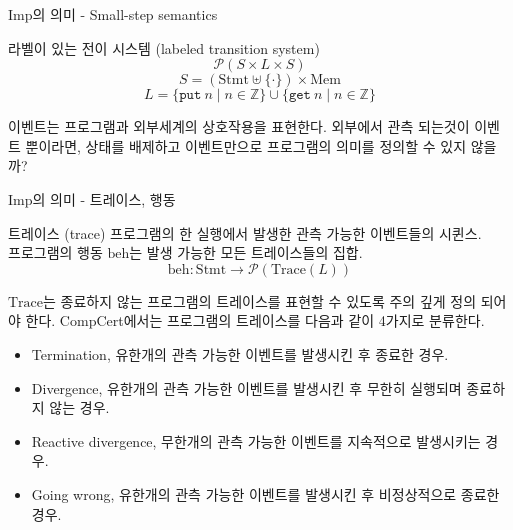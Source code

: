 \documentclass[10pt]{beamer}
\newcommand{\pow}[0]{\mathcal{P}}
\newcommand{\Stmt}[0]{\mathrm{Stmt}}
\newcommand{\putn}[1]{\texttt{put} \ #1}
\newcommand{\getn}[0]{\texttt{get}}
\newcommand{\Mem}[0]{\mathrm{Mem}}
\newcommand{\Trace}[0]{\mathrm{Trace}}
\newcommand{\beh}[0]{\mathrm{beh}}
\newcommand{\hoare}[3]{\{#1\} #2 \{#3\}}
\begin{document}
\begin{frame}{Imp의 의미 - Small-step semantics}
{\begin{block}{라벨이 있는 전이 시스템 (labeled transition system)}
      \[ \pow(S \times L \times S) \]
      \[ S = (\Stmt \uplus \{\cdot\}) \times \Mem \]
      \[ L = \{ \putn{n} \mid n \in \mathbb{Z} \} \cup \{ \getn \ n \mid n \in \mathbb{Z} \} \]

      이벤트는 프로그램과 외부세계의 상호작용을 표현한다.
      외부에서 관측 되는것이 이벤트 뿐이라면, 상태를 배제하고 이벤트만으로 프로그램의 의미를 정의할 수 있지 않을까?
    \end{block}
  }
\end{frame}

\begin{frame}{Imp의 의미 - 트레이스, 행동}
  \begin{block}{트레이스 (trace)}
    프로그램의 한 실행에서 발생한 관측 가능한 이벤트들의 시퀸스. \\
    프로그램의 행동 \(\beh\)는 발생 가능한 모든 트레이스들의 집합.
    \[ \beh : \Stmt \to \pow(\Trace(L)) \]

    \pause
    \(\Trace\)는 종료하지 않는 프로그램의 트레이스를 표현할 수 있도록 주의 깊게 정의 되어야 한다.
    CompCert에서는 프로그램의 트레이스를 다음과 같이 4가지로 분류한다.
    { \footnotesize
      \begin{itemize}
        \item Termination, 유한개의 관측 가능한 이벤트를 발생시킨 후 종료한 경우.
        \item Divergence, 유한개의 관측 가능한 이벤트를 발생시킨 후 무한히 실행되며 종료하지 않는 경우.
        \item Reactive divergence, 무한개의 관측 가능한 이벤트를 지속적으로 발생시키는 경우.
        \item Going wrong, 유한개의 관측 가능한 이벤트를 발생시킨 후 비정상적으로 종료한 경우.
      \end{itemize}
    }
  \end{block}
\end{frame}

\end{document}
